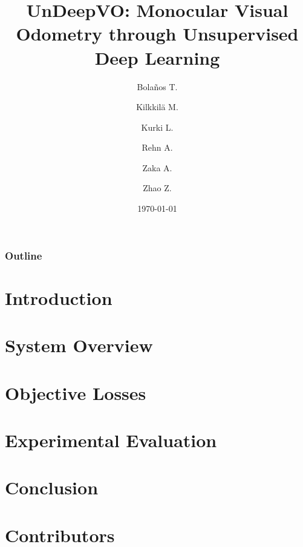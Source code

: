 \documentclass{beamer}
\title[UndeepVO]{UnDeepVO: Monocular Visual Odometry through Unsupervised Deep Learning}
\author{
    Bola\~nos T.\\
    \and
    Kilkkilä M.\\
    \and
    Kurki L.\\
    \and
    Rehn A.\\
    \and
    Zaka A.\\
    \and
    Zhao Z.
}
\date{\today}
\begin{document}
\begin{frame}
    \titlepage
\end{frame}

\begin{frame}
    \frametitle{Outline}
    \tableofcontents
\end{frame}

\section{Introduction}
\section{System Overview}
\section{Objective Losses}
\section{Experimental Evaluation}
\section{Conclusion}
\section{Contributors}







\end{document}
